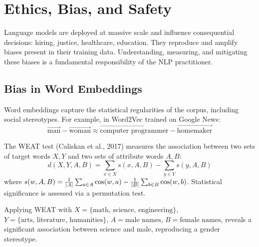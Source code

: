 \chapter{Ethics, Bias, and Safety}
\label{ch:ethics}

\begin{intuition}[title=\textbf{Responsibility in NLP}]
Language models are deployed at massive scale and influence consequential
decisions: hiring, justice, healthcare, education. They reproduce and
amplify biases present in their training data. Understanding, measuring,
and mitigating these biases is a fundamental responsibility of the NLP
practitioner.
\end{intuition}

\section{Bias in Word Embeddings}
\label{sec:ethics:embeddings}

\begin{definition}
Word embeddings capture the statistical regularities of the corpus,
including social stereotypes. For example, in Word2Vec trained on Google
News:
\[
    \vec{\text{man}} - \vec{\text{woman}} \approx
    \vec{\text{computer programmer}} - \vec{\text{homemaker}}
\]
\end{definition}

\begin{theorem}
The WEAT test (Caliskan et al., 2017) measures the association between
two sets of target words $X, Y$ and two sets of attribute words $A, B$:
\[
    d(X, Y, A, B) = \sum_{x \in X} s(x, A, B) - \sum_{y \in Y} s(y, A, B)
\]
where $s(w, A, B) = \frac{1}{\left| A \right|} \sum_{a \in A} \cos(w, a)
- \frac{1}{\left| B \right|} \sum_{b \in B} \cos(w, b)$.
Statistical significance is assessed via a permutation test.
\end{theorem}

\begin{example}
Applying WEAT with $X = \{\text{math, science, engineering}\}$,
$Y = \{\text{arts, literature, humanities}\}$,
$A = \text{male names}$, $B = \text{female names}$, reveals a
significant association between science and male, reproducing a gender
stereotype.
\end{example}

